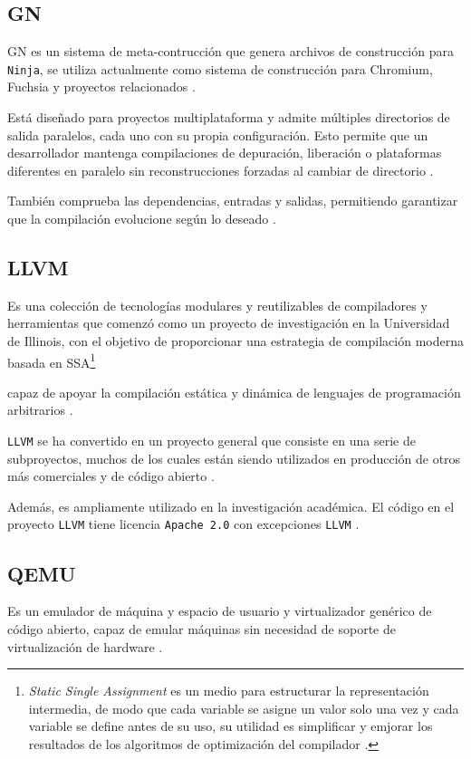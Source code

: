 \subsection{GN \label{ssec:gn}}
	GN es un sistema de meta-contrucción que genera archivos de construcción para \texttt{Ninja},  se utiliza actualmente como sistema de construcción para Chromium, Fuchsia y proyectos relacionados
	\cite{gn}.
	
	Está diseñado para proyectos multiplataforma y admite múltiples directorios de salida paralelos, cada uno con su propia configuración. Esto permite que un desarrollador mantenga compilaciones de depuración, liberación o plataformas diferentes en paralelo sin reconstrucciones forzadas al cambiar de directorio \cite{gn}.
	
	También comprueba las dependencias, entradas y salidas, permitiendo garantizar que la compilación evolucione según lo deseado \cite{gn}.
	
\newpage
\subsection{LLVM \label{ssec:llvm}}
	Es una colección de tecnologías modulares y reutilizables de compiladores y herramientas que comenzó como un proyecto de investigación en la Universidad de Illinois, con el objetivo de proporcionar una estrategia de compilación moderna basada en 
	SSA\footnote{
		\textit{Static Single Assignment}  es un medio para estructurar la representación intermedia, de modo que cada variable se asigne un valor solo una vez y cada variable se define antes de su uso, su utilidad es simplificar y emjorar los resultados de los algoritmos de optimización del compilador \cite{ssa_gfg}.
	}
	
	capaz de apoyar la compilación estática y dinámica de lenguajes de programación arbitrarios \cite{llvm}. 
	
	\texttt{LLVM} se ha convertido en un proyecto general que consiste en una serie de subproyectos, muchos de los cuales están siendo utilizados en producción de otros más comerciales y de código abierto \cite{llvm}.
	
	
	
	Además, es ampliamente utilizado en la investigación académica. El código en el proyecto \texttt{LLVM} tiene licencia \texttt{Apache 2.0} con excepciones \texttt{LLVM} \cite{llvm}.
	
\subsection{QEMU}
	Es un emulador de máquina y espacio de usuario y virtualizador genérico de código abierto, capaz de emular máquinas sin necesidad de soporte de virtualización de hardware \cite{qemu_repo}. 
	
